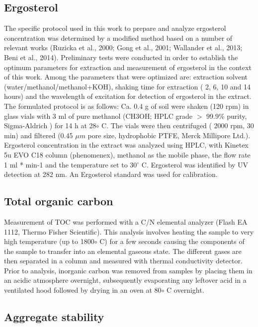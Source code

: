     \subsection{Ergosterol}
    	The specific protocol used in this work to prepare and analyze ergosterol concentration was determined by a modified method based on a number of relevant works (Ruzicka et al., 2000; Gong et al., 2001; Wallander et al., 2013; Beni et al., 2014). Preliminary tests were conducted in order to establish the optimum parameters for extraction and measurement of ergosterol in the context of this work. Among the parameters that were optimized are: extraction solvent (water/methanol/methanol+KOH), shaking time for extraction ( 2, 6, 10 and 14 hours) and the wavelength of excitation for detection of ergosterol in the extract. The formulated protocol is as follows: Ca. 0.4 g of soil were shaken (120 rpm) in glass vials with 3 ml of pure methanol (CH3OH; HPLC grade $ > $ 99.9\% purity, Sigma-Aldrich ) for 14 h at 28$ \circ $ C. The vials were then centrifuged ( 2000 rpm, 30 min) and filtered (0.45 $ \mu m $ pore size, hydrophobic PTFE, Merck Millipore Ltd.). Ergosterol concentration in the extract was analyzed using HPLC, with Kinetex 5u EVO C18 column (phenomenex), methanol as the mobile phase, the flow rate 1 ml * min-1 and the temperature set to 30$ ^\circ $ C. Ergosterol was identified by UV detection at 282 nm. An Ergosterol standard was used for calibration.


    \subsection{Total organic carbon}

    	Measurement of TOC was performed with a C/N elemental analyzer (Flash EA 1112, Thermo Fisher Scientific). This analysis involves heating the sample to very high temperature (up to 1800$\circ$ C) for a few seconds causing the components of the sample to transfer into an elemental gaseous state. The different gases are then separated in a column and measured with thermal conductivity detector. Prior to analysis, inorganic carbon was removed from samples by placing them in an acidic atmosphere overnight, subsequently evaporating any leftover acid in a ventilated hood followed by drying in an oven at 80$\circ$ C overnight.


    \subsection{Aggregate stability}

